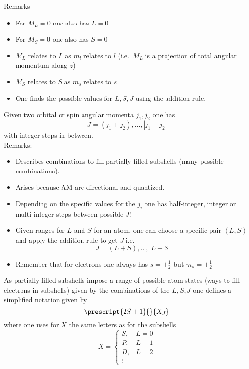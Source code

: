 Remarks
\begin{itemize}
    \item For $M_L=0$ one also has $L=0$
    \item For $M_S=0$ one also has $S=0$
    \item $M_L$ relates to $L$ as $m_l$ relates to $l$ (i.e.\ $M_L$ is a projection of total angular momentum along $z$)
    \item $M_S$ relates to $S$ as $m_s$ relates to $s$
    \item One finds the possible values for $L,S,J$ using the addition rule.
\end{itemize}


Given two orbital or spin angular momenta $j_1, j_2$ one has
\begin{equation*}
    J=(j_1+j_2),\dots,|j_1-j_2|
\end{equation*}
with integer steps in between.\\
Remarks:
\begin{itemize}
    \item Describes combinations to fill partially-filled subshells (many possible combinations).
    \item Arises because AM are directional and quantized.
    \item Depending on the specific values for the $j_i$ one has half-integer, integer or multi-integer steps between possible $J$!
    \item Given ranges for $L$ and $S$ for an atom, one can choose a specific pair $(L,S)$ and apply the addition rule to get $J$ i.e.
          \begin{equation*}
              J=(L+S),\dots,|L-S|
          \end{equation*}
    \item Remember that for electrons one always has $s=+\frac{1}{2}$ but $m_s=\pm \frac{1}{2}$
\end{itemize}


As partially-filled subshells impose a range of possible atom states (ways to fill electrons in subshells) given by the combinations of the $L,S,J$ one defines a simplified notation given by
\begin{equation*}
    \prescript{2S+1}{}{X_J}
\end{equation*}
where one uses for $X$ the same letters as for the subshells
\begin{equation*}
    X=
    \begin{cases}
        S,     & L=0 \\
        P,     & L=1 \\
        D,     & L=2 \\
        \vdots &
    \end{cases}
\end{equation*}

